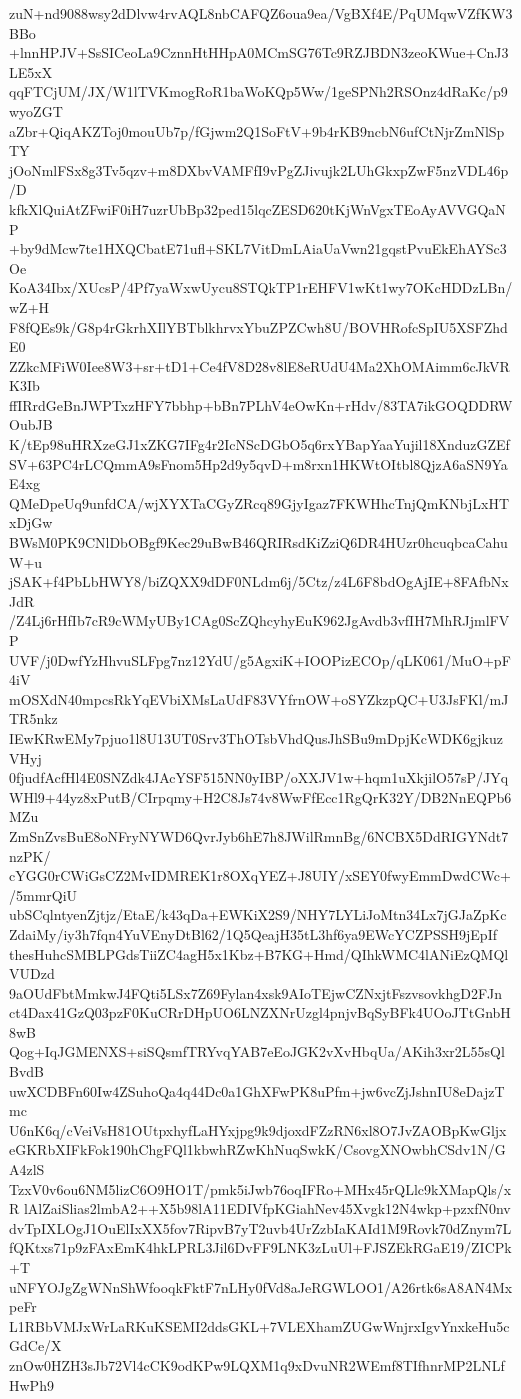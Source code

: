 zuN+nd9088wsy2dDlvw4rvAQL8nbCAFQZ6oua9ea/VgBXf4E/PqUMqwVZfKW3BBo
+lnnHPJV+SsSICeoLa9CznnHtHHpA0MCmSG76Tc9RZJBDN3zeoKWue+CnJ3LE5xX
qqFTCjUM/JX/W1lTVKmogRoR1baWoKQp5Ww/1geSPNh2RSOnz4dRaKc/p9wyoZGT
aZbr+QiqAKZToj0mouUb7p/fGjwm2Q1SoFtV+9b4rKB9ncbN6ufCtNjrZmNlSpTY
jOoNmlFSx8g3Tv5qzv+m8DXbvVAMFfI9vPgZJivujk2LUhGkxpZwF5nzVDL46p/D
kfkXlQuiAtZFwiF0iH7uzrUbBp32ped15lqcZESD620tKjWnVgxTEoAyAVVGQaNP
+by9dMcw7te1HXQCbatE71ufl+SKL7VitDmLAiaUaVwn21gqstPvuEkEhAYSc3Oe
KoA34Ibx/XUcsP/4Pf7yaWxwUycu8STQkTP1rEHFV1wKt1wy7OKcHDDzLBn/wZ+H
F8fQEs9k/G8p4rGkrhXIlYBTblkhrvxYbuZPZCwh8U/BOVHRofcSpIU5XSFZhdE0
ZZkcMFiW0Iee8W3+sr+tD1+Ce4fV8D28v8lE8eRUdU4Ma2XhOMAimm6cJkVRK3Ib
ffIRrdGeBnJWPTxzHFY7bbhp+bBn7PLhV4eOwKn+rHdv/83TA7ikGOQDDRWOubJB
K/tEp98uHRXzeGJ1xZKG7IFg4r2IcNScDGbO5q6rxYBapYaaYujil18XnduzGZEf
SV+63PC4rLCQmmA9sFnom5Hp2d9y5qvD+m8rxn1HKWtOItbl8QjzA6aSN9YaE4xg
QMeDpeUq9unfdCA/wjXYXTaCGyZRcq89GjyIgaz7FKWHhcTnjQmKNbjLxHTxDjGw
BWsM0PK9CNlDbOBgf9Kec29uBwB46QRIRsdKiZziQ6DR4HUzr0hcuqbcaCahuW+u
jSAK+f4PbLbHWY8/biZQXX9dDF0NLdm6j/5Ctz/z4L6F8bdOgAjIE+8FAfbNxJdR
/Z4Lj6rHfIb7cR9cWMyUBy1CAg0ScZQhcyhyEuK962JgAvdb3vfIH7MhRJjmlFVP
UVF/j0DwfYzHhvuSLFpg7nz12YdU/g5AgxiK+IOOPizECOp/qLK061/MuO+pF4iV
mOSXdN40mpcsRkYqEVbiXMsLaUdF83VYfrnOW+oSYZkzpQC+U3JsFKl/mJTR5nkz
IEwKRwEMy7pjuo1l8U13UT0Srv3ThOTsbVhdQusJhSBu9mDpjKcWDK6gjkuzVHyj
0fjudfAcfHl4E0SNZdk4JAcYSF515NN0yIBP/oXXJV1w+hqm1uXkjilO57sP/JYq
WHl9+44yz8xPutB/CIrpqmy+H2C8Js74v8WwFfEcc1RgQrK32Y/DB2NnEQPb6MZu
ZmSnZvsBuE8oNFryNYWD6QvrJyb6hE7h8JWilRmnBg/6NCBX5DdRIGYNdt7nzPK/
cYGG0rCWiGsCZ2MvIDMREK1r8OXqYEZ+J8UIY/xSEY0fwyEmmDwdCWc+/5mmrQiU
ubSCqlntyenZjtjz/EtaE/k43qDa+EWKiX2S9/NHY7LYLiJoMtn34Lx7jGJaZpKc
ZdaiMy/iy3h7fqn4YuVEnyDtBl62/1Q5QeajH35tL3hf6ya9EWcYCZPSSH9jEpIf
thesHuhcSMBLPGdsTiiZC4agH5x1Kbz+B7KG+Hmd/QIhkWMC4lANiEzQMQlVUDzd
9aOUdFbtMmkwJ4FQti5LSx7Z69Fylan4xsk9AIoTEjwCZNxjtFszvsovkhgD2FJn
ct4Dax41GzQ03pzF0KuCRrDHpUO6LNZXNrUzgl4pnjvBqSyBFk4UOoJTtGnbH8wB
Qog+IqJGMENXS+siSQsmfTRYvqYAB7eEoJGK2vXvHbqUa/AKih3xr2L55sQlBvdB
uwXCDBFn60Iw4ZSuhoQa4q44Dc0a1GhXFwPK8uPfm+jw6vcZjJshnIU8eDajzTmc
U6nK6q/cVeiVsH81OUtpxhyfLaHYxjpg9k9djoxdFZzRN6xl8O7JvZAOBpKwGljx
eGKRbXIFkFok190hChgFQl1kbwhRZwKhNuqSwkK/CsovgXNOwbhCSdv1N/GA4zlS
TzxV0v6ou6NM5lizC6O9HO1T/pmk5iJwb76oqIFRo+MHx45rQLlc9kXMapQls/xR
lAlZaiSlias2lmbA2++X5b98lA11EDIVfpKGiahNev45Xvgk12N4wkp+pzxfN0nv
dvTpIXLOgJ1OuElIxXX5fov7RipvB7yT2uvb4UrZzbIaKAId1M9Rovk70dZnym7L
fQKtxs71p9zFAxEmK4hkLPRL3Jil6DvFF9LNK3zLuUl+FJSZEkRGaE19/ZICPk+T
uNFYOJgZgWNnShWfooqkFktF7nLHy0fVd8aJeRGWLOO1/A26rtk6sA8AN4MxpeFr
L1RBbVMJxWrLaRKuKSEMI2ddsGKL+7VLEXhamZUGwWnjrxIgvYnxkeHu5cGdCe/X
znOw0HZH3sJb72Vl4cCK9odKPw9LQXM1q9xDvuNR2WEmf8TIfhnrMP2LNLfHwPh9
